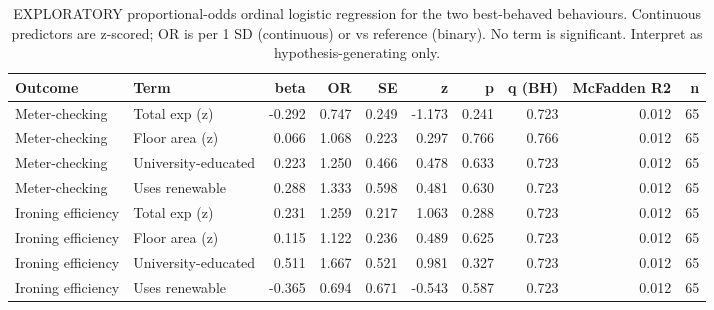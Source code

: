 \begin{table}
\caption{EXPLORATORY proportional-odds ordinal logistic regression for the two best-behaved behaviours. Continuous predictors are z-scored; OR is per 1 SD (continuous) or vs reference (binary). No term is significant. Interpret as hypothesis-generating only.}
\label{tab:ordlogit}
\begin{tabular}{llrrrrrrrr}
\toprule
Outcome & Term & beta & OR & SE & z & p & q (BH) & McFadden R2 & n \\
\midrule
Meter-checking & Total exp (z) & -0.292 & 0.747 & 0.249 & -1.173 & 0.241 & 0.723 & 0.012 & 65 \\
Meter-checking & Floor area (z) & 0.066 & 1.068 & 0.223 & 0.297 & 0.766 & 0.766 & 0.012 & 65 \\
Meter-checking & University-educated & 0.223 & 1.250 & 0.466 & 0.478 & 0.633 & 0.723 & 0.012 & 65 \\
Meter-checking & Uses renewable & 0.288 & 1.333 & 0.598 & 0.481 & 0.630 & 0.723 & 0.012 & 65 \\
Ironing efficiency & Total exp (z) & 0.231 & 1.259 & 0.217 & 1.063 & 0.288 & 0.723 & 0.012 & 65 \\
Ironing efficiency & Floor area (z) & 0.115 & 1.122 & 0.236 & 0.489 & 0.625 & 0.723 & 0.012 & 65 \\
Ironing efficiency & University-educated & 0.511 & 1.667 & 0.521 & 0.981 & 0.327 & 0.723 & 0.012 & 65 \\
Ironing efficiency & Uses renewable & -0.365 & 0.694 & 0.671 & -0.543 & 0.587 & 0.723 & 0.012 & 65 \\
\bottomrule
\end{tabular}
\end{table}
